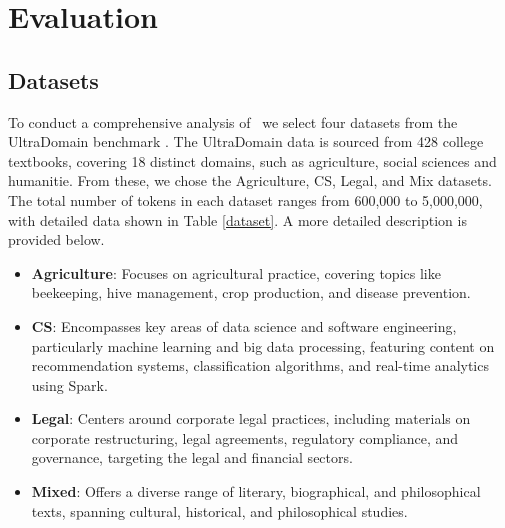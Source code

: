 \section{Evaluation}
\label{sec:eval}

\subsection{Datasets}


To conduct a comprehensive analysis of \model\, we select four datasets from the UltraDomain benchmark \cite{qian2024memorag}. The UltraDomain data is sourced from 428 college textbooks, covering 18 distinct domains, such as agriculture, social sciences and humanitie. From these, we chose the Agriculture, CS, Legal, and Mix datasets. The total number of tokens in each dataset ranges from 600,000 to 5,000,000, with detailed data shown in Table \ref{dataset}. A more detailed description is provided below.
\begin{itemize}
    \item \textbf{Agriculture}: Focuses on agricultural practice, covering topics like beekeeping, hive management, crop production, and disease prevention.
    
    \item  \textbf{CS}: Encompasses key areas of data science and software engineering, particularly machine learning and big data processing, featuring content on recommendation systems, classification algorithms, and real-time analytics using Spark.
    
    \item \textbf{Legal}: Centers around corporate legal practices, including materials on corporate restructuring, legal agreements, regulatory compliance, and governance, targeting the legal and financial sectors.
    
    \item \textbf{Mixed}: Offers a diverse range of literary, biographical, and philosophical texts, spanning cultural, historical, and philosophical studies.
\end{itemize}

